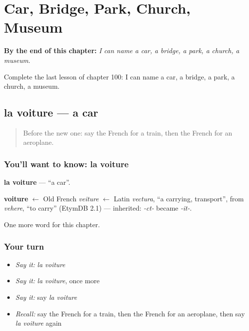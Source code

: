 
\chapter{Car, Bridge, Park, Church, Museum}
\label{ch:fr-car-bridge-park-church-museum}

\begin{chapteropening}
\textbf{By the end of this chapter:} \emph{I can name a car, a bridge, a park, a church, a museum.}

Complete the last lesson of chapter 100: I can name a car, a bridge, a park, a church, a museum.
\end{chapteropening}

\section[la voiture]{la voiture — a car}

\label{lesson:FR-C100-voiture}



\begin{quote}
Before the new one: say the French for a train, then the French for an aeroplane.
\end{quote}

\subsection*{You'll want to know: la voiture}
\textbf{la voiture} — \textquotedblleft{}a car\textquotedblright{}.

\begin{cousinweb}
\textbf{voiture} $\leftarrow$ Old French \emph{veiture} $\leftarrow$ Latin \emph{vectura}, \textquotedblleft{}a carrying, transport\textquotedblright{}, from \emph{vehere}, \textquotedblleft{}to carry\textquotedblright{} (EtymDB 2.1) — inherited: \emph{-ct-} became \emph{-it-}.
\end{cousinweb}

\begin{grammarlens}[title={What you've built}]
One more word for this chapter.
\end{grammarlens}

\subsection*{Your turn}
\begin{itemize}
\raggedright
  \item \emph{Say it:} \emph{la voiture}
  \item \emph{Say it:} \emph{la voiture}, once more
  \item \emph{Say it:} say \emph{la voiture}
  \item \emph{Recall:} say the French for a train, then the French for an aeroplane, then say \emph{la voiture} again
\end{itemize}


